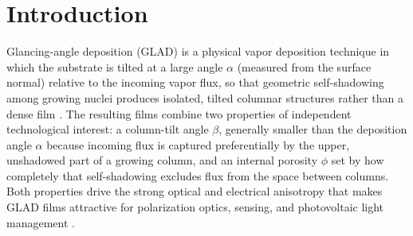 \documentclass[aip,amsmath,amssymb,reprint]{revtex4-1}
\begin{document}
\begin{abstract}
overturn the frequentist non-significance verdict -- it is consistent
with it: a
diffuse, imprecisely-localized effect of the size the
Bayesian $R^2$ posteriors suggest is exactly
what a permutation test at $n=14$--$46$ materials is underpowered to
detect at $p<0.05$. We present this paper as a resource for the
GLAD/materials-informatics community: a fully pre-registered,
diagnostically exhaustive account of where the statistical-power
boundary for this class of cross-material generalization problem
currently sits, together with the specific corpus-growth target
(professional literature-database access to 30+ elemental metals,
particularly platinum-group and rare-earth species) that would most
directly move it.
\end{abstract}

\maketitle

\section{Introduction}
\label{sec:intro}

Glancing-angle deposition (GLAD) is a physical vapor deposition
technique in which the substrate is tilted at a large angle
$\alpha$ (measured from the surface normal) relative to the incoming
vapor flux, so that geometric self-shadowing among growing nuclei
produces isolated, tilted columnar structures rather than a dense
film \citep{robbie1997,hawkeye2007,hawkeye2014}. The resulting films
combine two properties of independent technological interest: a
column-tilt angle $\beta$, generally smaller than the deposition angle
$\alpha$ because incoming flux is captured preferentially by the
upper, unshadowed part of a growing column, and an internal porosity
$\phi$ set by how completely that self-shadowing excludes flux from
the space between columns. Both properties drive the strong optical
and electrical anisotropy that makes GLAD films attractive for
polarization optics, sensing, and photovoltaic light management
\citep{brett2008science,lakhtakia2005stf,messier2000origin}.
\end{document}

